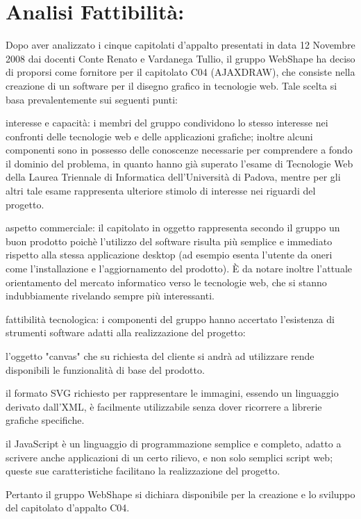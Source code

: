 \section{Analisi Fattibilit\`{a}:}
\indent \indent
Dopo aver analizzato i cinque capitolati d'appalto presentati in data 12 Novembre 2008 
dai docenti Conte Renato e Vardanega Tullio, il gruppo WebShape ha deciso di proporsi come 
fornitore per il capitolato C04 (AJAXDRAW), che consiste nella creazione di un software 
per il disegno grafico in tecnologie web.
Tale scelta si basa prevalentemente sui seguenti punti:
	\begin{elenconumerato}{\normindent}
		\item interesse e capacit\`{a}: i membri del gruppo condividono lo stesso interesse nei confronti delle tecnologie web e delle applicazioni grafiche; inoltre alcuni componenti sono in possesso delle conoscenze necessarie per comprendere a fondo il dominio del problema, in quanto hanno gi\`{a} superato l'esame di Tecnologie Web della Laurea Triennale di Informatica dell'Universit\`{a} di Padova, mentre per gli altri tale esame rappresenta ulteriore stimolo di interesse nei riguardi del progetto.
		\item aspetto commerciale: il capitolato in oggetto rappresenta secondo il gruppo un buon prodotto 
		poich\`{e} l'utilizzo del software risulta pi\`{u}  semplice e immediato rispetto alla stessa applicazione desktop	(ad esempio esenta l'utente da oneri come l'installazione e l'aggiornamento del prodotto).
		\`E da notare inoltre l'attuale orientamento del mercato informatico verso le tecnologie web, 
		che si stanno indubbiamente rivelando sempre pi\`{u} interessanti.
		\item fattibilit\`{a} tecnologica: i componenti del gruppo hanno accertato l'esistenza di strumenti software adatti alla realizzazione del progetto: 
				\begin{elencopuntato}[\normindent]
					\item l'oggetto "canvas" che su richiesta del cliente si andr\`a ad utilizzare rende disponibili le funzionalit\`a di base del prodotto.
					\item il formato SVG richiesto per rappresentare le immagini, essendo un linguaggio derivato dall'XML, \`e facilmente utilizzabile senza dover ricorrere a librerie grafiche specifiche.
					\item il JavaScript \`e un linguaggio di programmazione semplice e completo, adatto a scrivere anche applicazioni di un certo rilievo, e non solo semplici script web; queste sue caratteristiche facilitano la realizzazione del progetto.
				\end{elencopuntato}
\end{elenconumerato}

Pertanto il gruppo WebShape si dichiara disponibile per la creazione e lo sviluppo del capitolato d'appalto C04.


